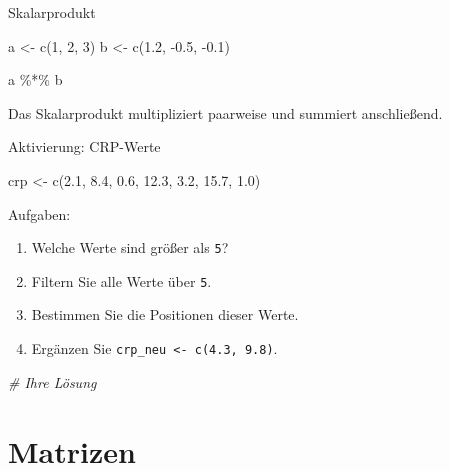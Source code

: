 \documentclass[
  10pt,
  ignorenonframetext,
  aspectratio=169,
]{beamer}
\newenvironment{Shaded}{}{}
\newcommand{\CommentTok}[1]{\textcolor[rgb]{0.38,0.63,0.69}{\textit{#1}}}
\newcommand{\DecValTok}[1]{\textcolor[rgb]{0.25,0.63,0.44}{#1}}
\newcommand{\FloatTok}[1]{\textcolor[rgb]{0.25,0.63,0.44}{#1}}
\newcommand{\FunctionTok}[1]{\textcolor[rgb]{0.02,0.16,0.49}{#1}}
\newcommand{\NormalTok}[1]{#1}
\newcommand{\OtherTok}[1]{\textcolor[rgb]{0.00,0.44,0.13}{#1}}
\newcommand{\SpecialCharTok}[1]{\textcolor[rgb]{0.25,0.44,0.63}{#1}}
\providecommand{\tightlist}{%
  \setlength{\itemsep}{0pt}\setlength{\parskip}{0pt}}
\begin{document}
\begin{frame}[fragile]{Skalarprodukt}
\label{skalarprodukt}
\begin{Shaded}
\begin{Highlighting}[]
\NormalTok{a }\OtherTok{\textless{}{-}} \FunctionTok{c}\NormalTok{(}\DecValTok{1}\NormalTok{, }\DecValTok{2}\NormalTok{, }\DecValTok{3}\NormalTok{)}
\NormalTok{b }\OtherTok{\textless{}{-}} \FunctionTok{c}\NormalTok{(}\FloatTok{1.2}\NormalTok{, }\SpecialCharTok{{-}}\FloatTok{0.5}\NormalTok{, }\SpecialCharTok{{-}}\FloatTok{0.1}\NormalTok{)}

\NormalTok{a }\SpecialCharTok{\%*\%}\NormalTok{ b}
\end{Highlighting}
\end{Shaded}

Das Skalarprodukt multipliziert paarweise und summiert anschließend.
\end{frame}

\begin{frame}[fragile]{Aktivierung: CRP-Werte}
\label{aktivierung-crp-werte}
\begin{Shaded}
\begin{Highlighting}[]
\NormalTok{crp }\OtherTok{\textless{}{-}} \FunctionTok{c}\NormalTok{(}\FloatTok{2.1}\NormalTok{, }\FloatTok{8.4}\NormalTok{, }\FloatTok{0.6}\NormalTok{, }\FloatTok{12.3}\NormalTok{, }\FloatTok{3.2}\NormalTok{, }\FloatTok{15.7}\NormalTok{, }\FloatTok{1.0}\NormalTok{)}
\end{Highlighting}
\end{Shaded}

Aufgaben:

\begin{enumerate}
\tightlist
\item
  Welche Werte sind größer als \texttt{5}?
\item
  Filtern Sie alle Werte über \texttt{5}.
\item
  Bestimmen Sie die Positionen dieser Werte.
\item
  Ergänzen Sie \texttt{crp\_neu\ \textless{}-\ c(4.3,\ 9.8)}.
\end{enumerate}

\begin{Shaded}
\begin{Highlighting}[]
\CommentTok{\# Ihre Lösung}
\end{Highlighting}
\end{Shaded}
\end{frame}

\section{Matrizen}\label{matrizen}
\end{document}
